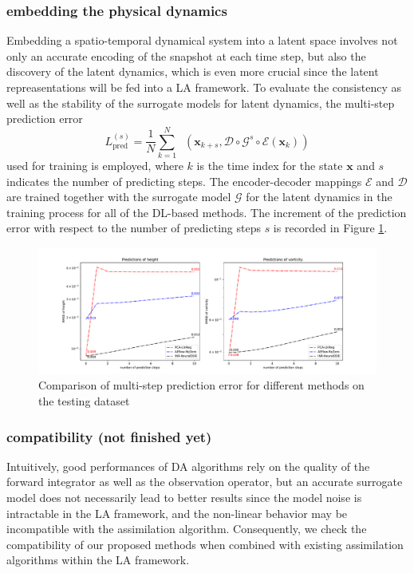 \documentclass{article}
\newcommand{\mE}{\mathcal{E}}
\newcommand{\mD}{\mathcal{D}}
\newcommand{\mG}{\mathcal{G}}
\DeclareMathOperator{\weightedloss}{\mathcal{L}^{\mathrm{weighted}}}
\begin{document}
\subsubsection{embedding the physical dynamics}
Embedding a spatio-temporal dynamical system into a latent space involves not only an accurate encoding of the snapshot at each time step, but also the discovery of the latent dynamics, which is even more crucial since the latent repreasentations will be fed into a LA framework. To evaluate the consistency as well as the stability of the surrogate models for latent dynamics, the multi-step prediction error
\[L_{\mathrm{pred}}^{(s)}=\frac1N\sum_{k=1}^N\weightedloss(\bm x_{k+s},\mD\circ\mG^s\circ\mE(\bm x_k))\]
used for training is employed, where $k$ is the time index for the state $\bm x$ and $s$ indicates the number of predicting steps. The encoder-decoder mappings $\mE$ and $\mD$ are trained together with the surrogate model $\mG$ for the latent dynamics in the training process for all of the DL-based methods. The increment of the prediction error with respect to the number of predicting steps $s$ is recorded in Figure \ref{fig:comp-multi-step}.
\begin{figure}
	\centering
	\includegraphics[width=.9\textwidth]{figs/dyn_rmse_comparison.pdf}
	\caption{Comparison of multi-step prediction error for different methods on the testing dataset}
	\label{fig:comp-multi-step}
\end{figure}
\subsubsection{compatibility (not finished yet)}
Intuitively, good performances of DA algorithms rely on the quality of the forward integrator as well as the observation operator, but an accurate surrogate model does not necessarily lead to better results since the model noise is intractable in the LA framework, and the non-linear behavior may be incompatible with the assimilation algorithm. Consequently, we check the compatibility of our proposed methods when combined with existing assimilation algorithms within the LA framework.
\end{document}
